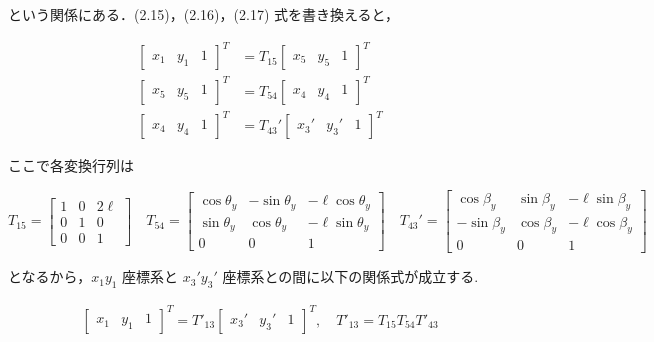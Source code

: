     という関係にある．(2.15)，(2.16)，(2.17) 式を書き換えると，
    
    \begin{align}
    \begin{bmatrix}
    x_1 & y_1 & 1
    \end{bmatrix}^T
    &= T_{15}
    \begin{bmatrix}
    x_5 & y_5 & 1
    \end{bmatrix}^T
    \tag{2.18} \\
    \begin{bmatrix}
    x_5 & y_5 & 1
    \end{bmatrix}^T
    &= T_{54}
    \begin{bmatrix}
    x_4 & y_4 & 1
    \end{bmatrix}^T
    \tag{2.19} \\
    \begin{bmatrix}
    x_4 & y_4 & 1
    \end{bmatrix}^T
    &= T_{43}'
    \begin{bmatrix}
    x_3' & y_3' & 1
    \end{bmatrix}^T
    \tag{2.20}
    \end{align}
    
    ここで各変換行列は
    
    \[
    T_{15} =
    \begin{bmatrix}
    1 & 0 & 2\ell \\
    0 & 1 & 0 \\
    0 & 0 & 1
    \end{bmatrix}
    \quad
    T_{54} =
    \begin{bmatrix}
    \cos\theta_y & -\sin\theta_y & -\ell \cos\theta_y \\
    \sin\theta_y & \cos\theta_y  & -\ell \sin\theta_y \\
    0 & 0 & 1
    \end{bmatrix}
    \quad
    T_{43}' =
    \begin{bmatrix}
    \cos\beta_y & \sin\beta_y & -\ell \sin\beta_y \\
    -\sin\beta_y & \cos\beta_y & -\ell \cos\beta_y \\
    0 & 0 & 1
    \end{bmatrix}
    \]
    
    となるから，$x_1 y_1$ 座標系と $x_3' y_3'$ 座標系との間に以下の関係式が成立する.
    
    \begin{align}
    \begin{bmatrix}
    x_1 & y_1 & 1
    \end{bmatrix}^T
    = T'_{13}
    \begin{bmatrix}
    x_3' & y_3' & 1
    \end{bmatrix}^T
    ,
    \quad
    T'_{13} = T_{15} T_{54} T'_{43}
    \tag{2.21}
    \end{align}

